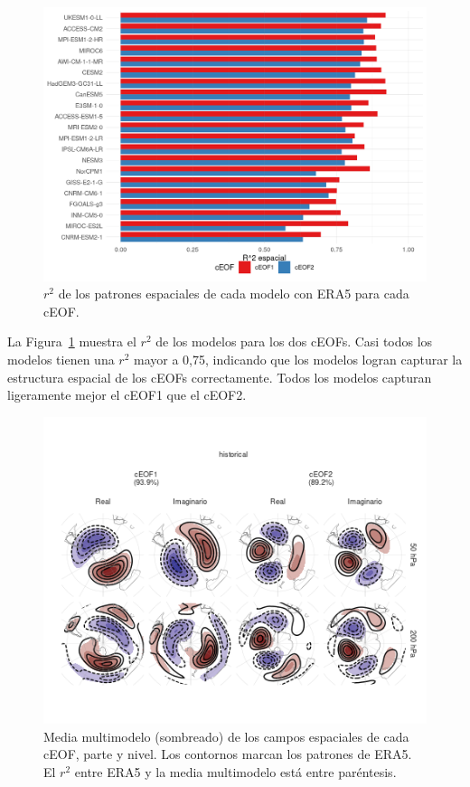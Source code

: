 \documentclass[12pt,oneside]{reedthesis}
\begin{document}
\begin{figure}
\includegraphics{figures/50-cmip6/comparacion-r2-1} \caption{\(r^2\) de los patrones espaciales de cada modelo con ERA5 para cada cEOF.}\label{fig:comparacion-r2}
\end{figure}

La Figura~\ref{fig:comparacion-r2} muestra el \(r^2\) de los modelos para los dos cEOFs.
Casi todos los modelos tienen una \(r^2\) mayor a 0,75, indicando que los modelos logran capturar la estructura espacial de los cEOFs correctamente.
Todos los modelos capturan ligeramente mejor el cEOF1 que el cEOF2.


\begin{figure}
\includegraphics{figures/50-cmip6/mmm-1} \caption{Media multimodelo (sombreado) de los campos espaciales de cada cEOF, parte y nivel. Los contornos marcan los patrones de ERA5. El \(r^2\) entre ERA5 y la media multimodelo está entre paréntesis.}\label{fig:mmm}
\end{figure}
\end{document}
